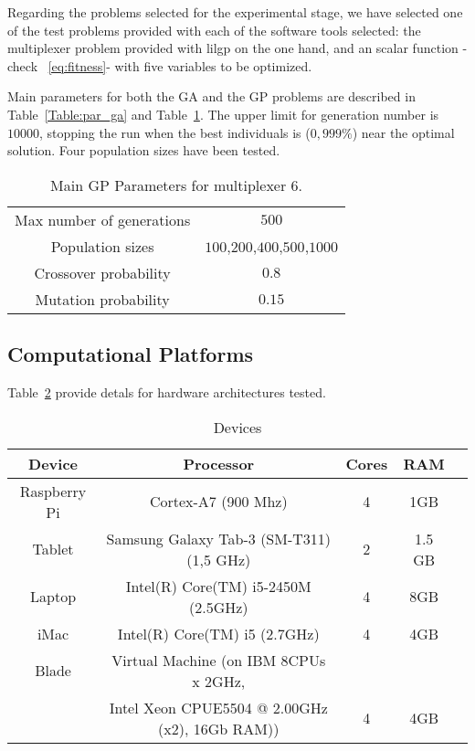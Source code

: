Regarding the problems selected for the experimental stage, we have selected one of the test problems provided with each of the software tools selected:  the multiplexer problem provided with lilgp on the one hand, and an scalar function -check ~\ref{eq:fitness}-  with five variables to be optimized. 

Main parameters for both the GA and the GP problems are described in Table~\ref{Table:par_ga} and Table~\ref{Table:par_gp}.  The upper limit for generation number is  $10000$, stopping the run when the best individuals is ($0,999\%$) near the optimal solution. Four population sizes have been tested.

\begin{table}
\centering
\caption{Main GP Parameters for multiplexer 6.}
\label{Table:par_gp}
\begin{tabular}{cc}
\hline
Max number of generations & $500$ \\
Population sizes & $100$,$200$,$400$,$500$,$1000$ \\
Crossover probability & $0.8$ \\ 
Mutation probability & $0.15$ \\ 
\hline
\end{tabular}
\end{table}


\subsection{Computational Platforms}

Table~\ref{Table:devices} provide detals for hardware architectures tested. 
\begin{table}
\centering
\caption{Devices}
\label{Table:devices}
\begin{tabular}{ccccc} \hline
Device		&	Processor			&	Cores	&	RAM \\ \hline
Raspberry Pi	& Cortex-A7 (900 Mhz)	& 4 			&	1GB \\
Tablet		& Samsung Galaxy Tab-3 (SM-T311) (1,5 GHz)& 2  & 1.5 GB \\
Laptop 		& Intel(R) Core(TM) i5-2450M (2.5GHz)	&	4	&	8GB\\
iMac			& Intel(R) Core(TM) i5  (2.7GHz)	& 4	& 4GB \\
Blade		& Virtual Machine (on IBM 8CPUs x 2GHz, \\
&Intel Xeon CPUE5504 @ 2.00GHz (x2), 16Gb RAM)) & 4 & 4GB \\
\hline
\end{tabular}
\end{table}

